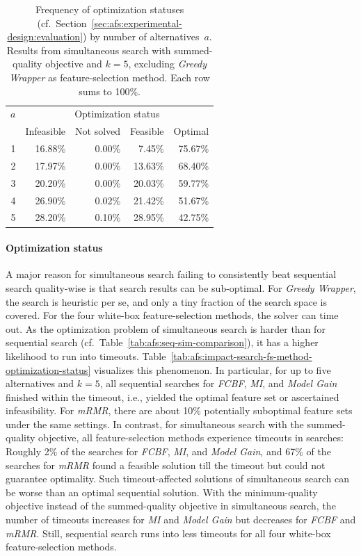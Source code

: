 \documentclass{article}
\theoremstyle{definition}
\begin{document}
\begin{table}[htb]
	\centering
	\begin{tabular}{rrrrr}
		\toprule
		$a$ & \multicolumn{4}{c}{Optimization status} \\
		\cmidrule(r){2-5}
		& Infeasible & Not solved & Feasible & Optimal \\
		\midrule
		1 & 16.88\% & 0.00\% & 7.45\% & 75.67\% \\
		2 & 17.97\% & 0.00\% & 13.63\% & 68.40\% \\
		3 & 20.20\% & 0.00\% & 20.03\% & 59.77\% \\
		4 & 26.90\% & 0.02\% & 21.42\% & 51.67\% \\
		5 & 28.20\% & 0.10\% & 28.95\% & 42.75\% \\
		\bottomrule
	\end{tabular}
	\caption{
		Frequency of optimization statuses (cf.~Section~\ref{sec:afs:experimental-design:evaluation}) by number of alternatives~$a$.
		Results from simultaneous search with summed-quality objective and $k=5$, excluding \emph{Greedy Wrapper} as feature-selection method.
		Each row sums to 100\%.
	}
	\label{tab:afs:impact-num-alternatives-optimization-status}
\end{table}

\paragraph{Optimization status}

A major reason for simultaneous search failing to consistently beat sequential search quality-wise is that search results can be sub-optimal.
For \emph{Greedy Wrapper}, the search is heuristic per se, and only a tiny fraction of the search space is covered.
For the four white-box feature-selection methods, the solver can time out.
As the optimization problem of simultaneous search is harder than for sequential search (cf.~Table~\ref{tab:afs:seq-sim-comparison}), it has a higher likelihood to run into timeouts.
Table~\ref{tab:afs:impact-search-fs-method-optimization-status} visualizes this phenomenon.
In particular, for up to five alternatives and $k=5$, all sequential searches for \emph{FCBF}, \emph{MI}, and \emph{Model Gain} finished within the timeout, i.e., yielded the optimal feature set or ascertained infeasibility.
For \emph{mRMR}, there are about 10\% potentially suboptimal feature sets under the same settings.
In contrast, for simultaneous search with the summed-quality objective, all feature-selection methods experience timeouts in searches:
Roughly 2\% of the searches for \emph{FCBF}, \emph{MI}, and \emph{Model Gain}, and 67\% of the searches for \emph{mRMR} found a feasible solution till the timeout but could not guarantee optimality.
Such timeout-affected solutions of simultaneous search can be worse than an optimal sequential solution.
With the minimum-quality objective instead of the summed-quality objective in simultaneous search, the number of timeouts increases for \emph{MI} and \emph{Model Gain} but decreases for \emph{FCBF} and \emph{mRMR}.
Still, sequential search runs into less timeouts for all four white-box feature-selection methods.
\end{document}
